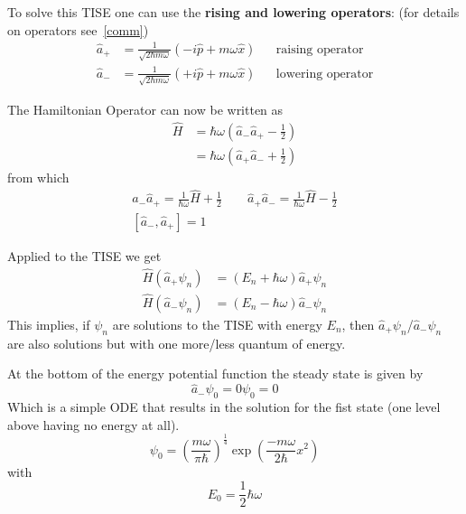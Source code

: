 
To solve this TISE one can use the \textbf{rising and lowering operators}: (for details on operators see~\ref{comm})
\begin{align*}
    \widehat{a}_{+} & = \frac{1}{\sqrt{2\hbar m \omega}}\left(-i\widehat{p}+m\omega\widehat{x}\right) &  & \text{raising operator}  \\
    \widehat{a}_{-} & = \frac{1}{\sqrt{2\hbar m \omega}}\left(+i\widehat{p}+m\omega\widehat{x}\right) &  & \text{lowering operator}
\end{align*}


The Hamiltonian Operator can now be written as
\noindent\begin{align*}
    \widehat{H} & =\hbar\omega\left(\widehat{a}_{-}\widehat{a}_{+}-\frac{1}{2}\right) \\
                & =\hbar\omega\left(\widehat{a}_{+}\widehat{a}_{-}+\frac{1}{2}\right)
\end{align*}
from which
\noindent\begin{gather*}
    \widehat{a}_{-}\widehat{a}_{+}=\frac{1}{\hbar\omega}\widehat{H}+\frac{1}{2} \quad\quad \widehat{a}_{+}\widehat{a}_{-}=\frac{1}{\hbar\omega}\widehat{H}-\frac{1}{2}\\
    \left[\widehat{a}_{-},\widehat{a}_{+}\right] = 1
\end{gather*}


Applied to the TISE we get
\begin{align*}
    \widehat{H}(\widehat{a}_{+}\psi_n) & = (E_n+\hbar\omega)\widehat{a}_{+}\psi_n \\
    \widehat{H}(\widehat{a}_{-}\psi_n) & = (E_n-\hbar\omega)\widehat{a}_{-}\psi_n
\end{align*}
This implies, if $\psi_n$ are solutions to the TISE with energy $E_n$, then $\widehat{a}_{+}\psi_n$/$\widehat{a}_{-}\psi_n$ are also solutions but with one more/less quantum of energy.
\newpar{}

At the bottom of the energy potential function the steady state is given by
\begin{equation*}
    \widehat{a}_{-}\psi_0 = 0\psi_0 = 0
\end{equation*}
Which is a simple ODE that results in the solution for the fist state (one level above having no energy at all).
\begin{equation*}
    \psi_0 = {\left(\frac{m\omega}{\pi\hbar}\right)}^{\frac{1}{4}}\exp\left(\frac{-m\omega}{2\hbar}x^2\right)
\end{equation*}
with
\begin{equation*}
    E_0 = \frac{1}{2}\hbar\omega
\end{equation*}
\newpar{}

